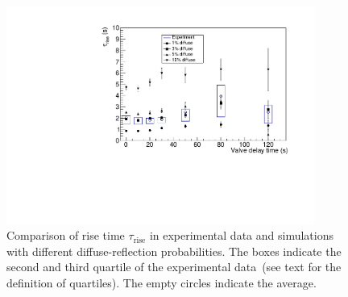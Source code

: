\begin{figure}[h!]
\centering
\includegraphics[width=0.9\textwidth]{risetime.pdf}
\caption{Comparison of rise time $\tau_{\mathrm{rise}}$ in
  experimental data and simulations with different diffuse-reflection
  probabilities. The boxes indicate the second and third quartile of
  the experimental data~(see text for the definition of
  quartiles). The empty circles indicate the average.}
\label{fig:risetime}
\end{figure}





